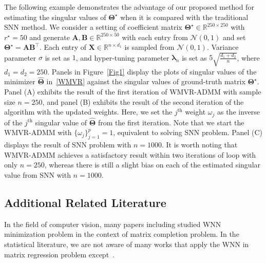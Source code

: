 \documentclass[alpha-refs]{wiley-article}
\begin{document}
The following example demonstrates the advantage of our proposed method for estimating the singular values of $\boldsymbol{\Theta^{\star}}$ when it is compared with the traditional SNN method.
We consider a setting of coefficient matrix $\boldsymbol{\Theta}^{\star}\in\mathbb{R}^{250 \times 250}$ with $r^{\star}=50$ and generate $\boldsymbol{A}, \boldsymbol{B} \in \mathbb{R}^{250 \times 50}$ with each entry from $\mathcal{N}(0,1)$ and set $\boldsymbol{\Theta}^{\star}=\boldsymbol{AB^{\top}}$.
Each entry of $\boldsymbol{X}\in\mathbb{R}^{n \times d_{1}}$ is sampled from $\mathcal{N}(0,1)$.
Variance parameter $\sigma$ is set as $1$, and hyper-tuning parameter $\boldsymbol{\lambda}_{n}$ is set as $5\sqrt{\frac{d_{1}+d_{2}}{n}}$, where $d_{1}=d_{2}=250$.
Panels in Figure~\ref{Fig1} display the plots of singular values of the minimizer $\widehat{\boldsymbol{\Theta}}$ in~\eqref{WMVR} against the singular values of ground-truth matrix $\boldsymbol{\Theta^{\star}}$.
Panel (A) exhibits the result of the first iteration of WMVR-ADMM with sample size $n=250$, and panel (B) exhibits the result of the second iteration of the algorithm with the updated weights.
Here, we set the $j^{\text{th}}$ weight $\omega_{j}$ as the inverse of the $j^{\text{th}}$ singular value of $\widehat{\boldsymbol{\Theta}}$ from the first iteration.
Note that we start the WMVR-ADMM with $\{\omega_{j}\}_{j=1}^{p}=1$, equivalent to solving SNN problem.
Panel (C) displays the result of SNN problem with $n=1000$.
It is worth noting that WMVR-ADMM achieves a satisfactory result within two iterations of loop with only $n=250$, whereas there is still a slight bias on each of the estimated singular value from SNN with $n=1000$.

\subsection{Additional Related Literature}
In the field of computer vision, many papers including \citet{gu2014weighted,gu2017weighted,xu2017multi,yair2018multi,liu2018speckle,kim2020cauchy} studied WNN minimization problem in the context of matrix completion problem.
In the statistical literature, we are not aware of many works that apply the WNN in matrix regression problem except~\citet{chen2013reduced}.
\end{document}
